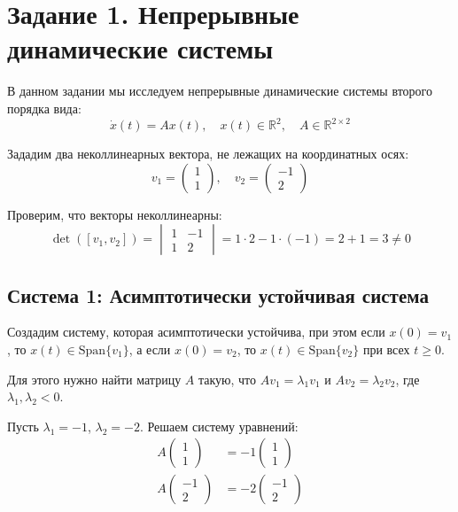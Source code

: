\section{Задание 1. Непрерывные динамические системы}

В данном задании мы исследуем непрерывные динамические системы второго порядка вида:
\begin{equation}
\dot{x}(t) = Ax(t), \quad x(t) \in \mathbb{R}^2, \quad A \in \mathbb{R}^{2 \times 2}
\end{equation}

Зададим два неколлинеарных вектора, не лежащих на координатных осях:
\begin{equation}
v_1 = \begin{pmatrix} 1 \\ 1 \end{pmatrix}, \quad v_2 = \begin{pmatrix} -1 \\ 2 \end{pmatrix}
\end{equation}

Проверим, что векторы неколлинеарны:
\begin{equation}
\det([v_1, v_2]) = \begin{vmatrix} 1 & -1 \\ 1 & 2 \end{vmatrix} = 1 \cdot 2 - 1 \cdot (-1) = 2 + 1 = 3 \neq 0
\end{equation}

\subsection{Система 1: Асимптотически устойчивая система}

Создадим систему, которая асимптотически устойчива, при этом если $x(0) = v_1$, то $x(t) \in \text{Span}\{v_1\}$, а если $x(0) = v_2$, то $x(t) \in \text{Span}\{v_2\}$ при всех $t \geq 0$.

Для этого нужно найти матрицу $A$ такую, что $Av_1 = \lambda_1 v_1$ и $Av_2 = \lambda_2 v_2$, где $\lambda_1, \lambda_2 < 0$.

Пусть $\lambda_1 = -1$, $\lambda_2 = -2$. Решаем систему уравнений:
\begin{align}
A \begin{pmatrix} 1 \\ 1 \end{pmatrix} &= -1 \begin{pmatrix} 1 \\ 1 \end{pmatrix} \\
A \begin{pmatrix} -1 \\ 2 \end{pmatrix} &= -2 \begin{pmatrix} -1 \\ 2 \end{pmatrix}
\end{align}

